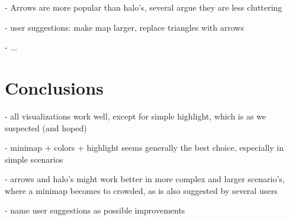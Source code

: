 - Arrows are more popular than halo's, several argue they are less cluttering

- user suggestions: make map larger, replace triangles with arrows

- ...

\section{Conclusions} \label{sec:user:discussion}
- all visualizations work well, except for simple highlight, which is as we suspected (and hoped)

- minimap + colors + highlight seems generally the best choice, especially in simple scenarios

- arrows and halo's might work better in more complex and larger scenario's, where a minimap becomes to crowded, as is also suggested by several users

- name user suggestions as possible improvements
